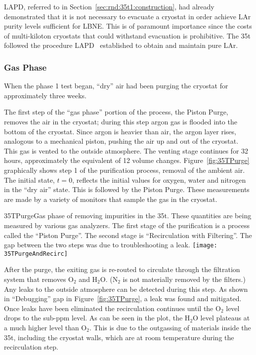 LAPD, referred to in Section~\ref{sec:rnd:35t1:construction},
 had already demonstrated that it is not necessary to evacuate a cryostat in order achieve 
LAr purity levels sufficient for LBNE. 
This is of paramount importance since the costs of multi-kiloton cryostats that 
could withstand evacuation is prohibitive. 
The 35t followed the procedure LAPD~\cite{bib:lapdP07005}
established to obtain and maintain pure LAr. 

\subsubsection {Gas Phase}

When the phase 1 test began, ``dry'' air had been purging the cryostat for approximately three weeks. 

The first step of the ``gas phase'' portion of the process, the Piston Purge, removes the air in the cryostat; during this step argon gas is flooded into the bottom of the cryostat. Since argon is heavier than air, the argon layer rises, analogous to a mechanical piston, pushing the air up and out of the cryostat. This gas  is vented to the outside atmosphere. The venting stage continues for 32 hours, approximately the equivalent of 12 volume changes. 
%
Figure~\ref{fig:35TPurge} graphically shows step 1 of the purification process, removal of the ambient air. The initial state, $t=0$, reflects the initial values for oxygen, water and nitrogen in the ``dry air'' state. This is followed by the Piston Purge.
These measurements are made by a variety of %
monitors that sample the gas in the cryostat. 

\begin{cdrfigure}{35TPurge}{Gas phase of removing impurities in the 35t. These quantities are being measured by various gas analyzers. The first stage of the purification is a process called the ``Piston Purge''.  The second stage is ``Recirculation with Filtering''. The gap between the two steps was due to troubleshooting a leak.}
  \texttt{[image: 35TPurgeAndRecirc]}
\end{cdrfigure}


After the purge, the exiting gas  is re-routed to circulate through the filtration system that removes O$_2$ and H$_2$O. (N$_2$ is not materially removed by the filters.) Any leaks to the outside atmosphere can be detected during this step. As shown in ``Debugging'' gap in Figure~\ref{fig:35TPurge}, a leak was found and mitigated. Once leaks have been eliminated the recirculation continues until the O$_2$ level drops to the sub-ppm level. As can be seen in the plot, the H$_2$O level plateaus at a much higher level than O$_2$. This is due to the outgassing of materials inside the 35t, including the cryostat walls, which are  at room temperature during  the recirculation step. 

